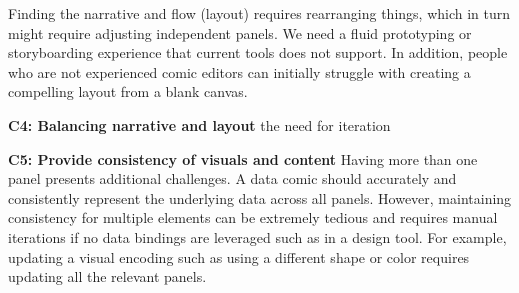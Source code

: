 

Finding the narrative and flow (layout) requires rearranging things, which in turn might require adjusting independent panels. We need a fluid prototyping or storyboarding experience that current tools does not support. In addition, people who are not experienced comic editors can initially struggle with creating a compelling layout from a blank canvas. 


\textbf{C4: Balancing narrative and layout}
the need for iteration


\textbf{C5: Provide consistency of visuals and content}
Having more than one panel presents additional challenges. A data comic should accurately and consistently represent the underlying data across all panels. However, maintaining consistency for multiple elements can be extremely tedious and requires manual iterations if no data bindings are leveraged such as in a design tool. For example, updating a visual encoding such as using a different shape or color requires updating all the relevant panels. 





